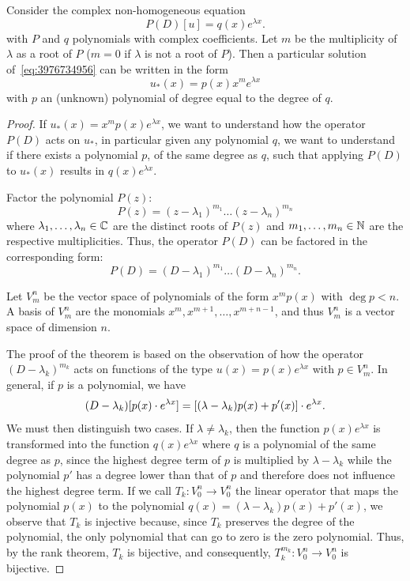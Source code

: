 \begin{theorem}
\mymark{***}
Consider the complex non-homogeneous equation
\begin{equation}\label{eq:3976734956}
 P(D) [u] = q(x) e^{\lambda x}.
\end{equation}
with $P$ and $q$ polynomials with complex coefficients.
Let $m$ be the multiplicity of $\lambda$ as a root of $P$ ($m=0$ if $\lambda$ is
not a root of $P$).
Then a particular solution of~\eqref{eq:3976734956} can be written in the form
\begin{equation}
\label{eq:945396}
u_*(x) = p(x) x^m e^{\lambda x}
\end{equation}
with $p$ an (unknown) polynomial of degree equal to the degree of $q$.
\end{theorem}
%
\begin{proof}
If $u_*(x) = x^m p(x) e^{\lambda x}$, we want to understand how the operator
$P(D)$ acts on $u_*$, in particular
given any polynomial $q$, we want to understand
if there exists a polynomial $p$, of the same degree as $q$, such that applying
$P(D)$ to $u_*(x)$ results in $q(x) e^{\lambda x}$.

Factor the polynomial $P(z)$:
\[
  P(z) = (z-\lambda_1)^{m_1}\dots (z-\lambda_n)^{m_n}
\]
where $\lambda_1, \dots, \lambda_n\in {\mathbb C}$ are the distinct roots of $P(z)$ and
$m_1,\dots,m_n\in {\mathbb N}$ are the respective multiplicities. Thus, the operator
$P(D)$ can be factored in the corresponding form:
\[
   P(D) = (D-\lambda_1)^{m_1} \dots (D-\lambda_n)^{m_n}.
\]

Let $V^n_m$ be the vector space of polynomials of the form $x^m p(x)$ with $\deg
p<n$.
A basis of $V^n_m$ are the monomials $x^m, x^{m+1}, \dots, x^{m+n-1}$, and thus
$V^n_m$ is a
vector space of dimension $n$.

The proof of the theorem is based on the observation of how the operator
$(D-\lambda_k)^{m_k}$
acts on functions of the type $u(x) = p(x) e^{\lambda x}$ with $p\in V^n_m$. In
general, if $p$ is a
polynomial, we have
\[
 (D-\lambda_k) [p(x)\cdot e^{\lambda x}]
 = {\left[ (\lambda -\lambda_k)p(x) + p'(x) \right]} \cdot e^{\lambda x}.
\]
We must then distinguish two cases. If $\lambda\neq \lambda_k$, then the
function $p(x) e^{\lambda x}$ is transformed into the function $q(x) e^{\lambda
x}$ where $q$ is a polynomial of the same degree as $p$, since the highest
degree term of $p$ is multiplied by $\lambda-\lambda_k$ while the polynomial
$p'$ has a degree lower than that of $p$ and therefore does not influence the
highest degree term. If we call $T_k\colon V^n_0 \to V^n_0$ the linear operator
that maps the polynomial $p(x)$ to the polynomial $q(x)=(\lambda-\lambda_k) p(x)
+ p'(x)$, we observe that $T_k$ is injective because, since $T_k$ preserves the
degree of the polynomial, the only polynomial that can go to zero is the zero
polynomial. Thus, by the rank theorem, $T_k$ is bijective, and consequently,
$T_k^{m_k} \colon V^n_0 \to V^n_0$ is bijective.


\end{proof}
